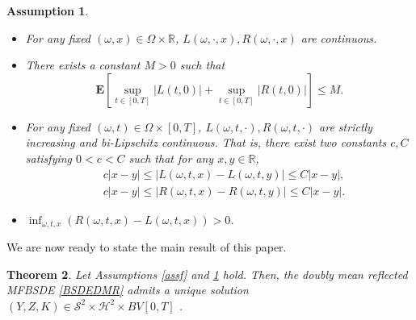 \documentclass[10pt]{article}%
\numberwithin{equation}{section}
\newtheorem{theorem}{Theorem}[section]
\newtheorem{assumption}[theorem]{Assumption}
\begin{document}
\begin{assumption}\label{assLR}
\begin{itemize}
\item[(i)] For any fixed $(\omega,x)\in \Omega\times\mathbb{R}$, $L(\omega, \cdot, x), R(\omega, \cdot, x)$ are continuous.
\item[(ii)]  %
There exists a constant $M>0$ such that $$\mathbf{E}\left[\sup_{t\in[0,T]}\left|L(t,0)\right|+\sup_{t\in[0,T]}\left|R(t,0)\right|\right]\leq M.$$
\item[(iii)] For any fixed $(\omega,t)\in \Omega\times [0,T]$, $L(\omega,t,\cdot),R(\omega,t,\cdot)$ are strictly increasing and bi-Lipschitz continuous. That is, there  exist two constants $c,C$ satisfying $0<c<C$ such that for any $x,y\in \mathbb{R}$,
\begin{align*}
&c\left|x-y\right|\leq \left|L(\omega,t,x)-L(\omega,t,y)\right|\leq C\left|x-y\right|,\\
&c\left|x-y\right|\leq \left|R(\omega,t,x)-R(\omega,t,y)\right|\leq C\left|x-y\right|.
\end{align*}
\item[(iv)] $\inf_{\omega,t,x} \left(R(\omega,t,x)-L(\omega,t,x)\right)>0$.
\end{itemize}
\end{assumption}

We are now ready to state the main result of this paper.
\begin{theorem}\label{th-1}
 Let Assumptions \ref{assf} and \ref{assLR} hold. Then, the doubly mean reflected MFBSDE \eqref{BSDEDMR} admits a unique  solution $(Y,Z,K)\in \mathcal{S}^2\times\mathcal{H}^2\times BV[0,T]$ . 
\end{theorem}
\end{document}
